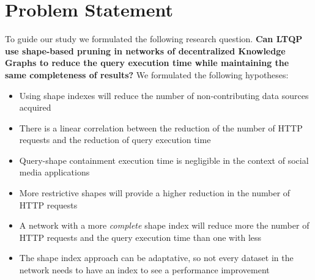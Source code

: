\section{Problem Statement}\label{sec:problem_statement}
To guide our study we formulated the following research question.
\textbf{Can LTQP use shape-based pruning in networks of decentralized Knowledge Graphs to reduce the query execution time while maintaining the same completeness of results?}
We formulated the following hypotheses:
\setcounter{hypothesisCounter}{1}

\begin{itemize}[label=\textbf{H}\,]
    \item Using shape indexes will reduce the number of non-contributing data sources acquired
    \item There is a linear correlation between the reduction of the number of HTTP requests and the reduction of query execution time
    \item Query-shape containment execution time is negligible in the context of social media applications
    \item More restrictive shapes will provide a higher reduction in the number of HTTP requests
    \item A network with a more \emph{complete} shape index will reduce more the number of HTTP requests and the query execution time than one with less
    \item The shape index approach can be adaptative, so not every dataset in the network needs to have an index to see a performance improvement
\end{itemize}
